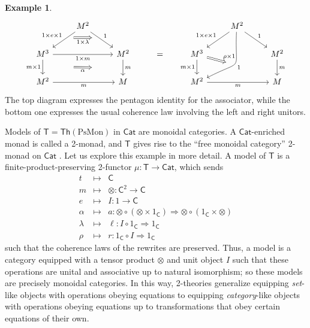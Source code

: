 \documentclass{amsart}
\theoremstyle{definition}
\newtheorem{example}[theorem]{Example}
\newcommand{\Th}{\mathsf{Th}}
\newcommand{\Cat}{\mathsf{Cat}}
\newcommand{\C}{\mathsf{C}}
\newcommand{\T}{\mathsf{T}}
\newcommand{\maps}{\colon}
\begin{document}
\begin{example}
      \[\begin{tikzcd}
          & M^2 \ar[dl,"1\times e\times 1",""name=a1,swap] \ar[dr,"1",""name=a2] \arrow[Rightarrow,from=a1,to=a2,"1\times \lambda",swap,shorten >=0.4cm,shorten <=0.4cm] & && & M^2 \ar[dl,"1\times e\times 1",swap] \ar[dr,"1"] \ar[ddl,bend left =30,looseness=2, "1",""name=c1] & \\
          M^3 \ar[d,"m\times 1",swap,""name=b1] \ar[rr,"1\times m",swap] && M^2 \ar[d,"m",""name=b2] \arrow[Rightarrow,from=b1,to=b2,"\alpha",shorten >=1.3cm,shorten <=1.3cm,swap] & = & M^3 \ar[d,"m\times 1",swap] \arrow[Rightarrow,to=c1,"\rho\times 1",shorten >=0.4cm,shorten <=0.0cm] && M^2 \ar[d,"m"] \\
          M^2 \ar[rr,"m",swap] && M && M^2 \ar[rr,"m",swap] && M
        \end{tikzcd}\]
\noindent The top diagram expresses the pentagon identity for the associator, while the bottom one expresses the usual coherence law involving the left and right unitors.
   
Models of $\T = \Th(\mathrm{PsMon})$ in $\Cat$ are monoidal categories.   A $\Cat$-enriched monad is called a 2-monad, and $\T$ gives rise to the ``free monoidal category'' 2-monad on $\Cat$ \cite{bkp}.
Let us explore this example in more detail.  A model of $\T$ is a finite-product-preserving 2-functor $\mu\colon \T\to \Cat$, which sends 
\[\begin{array}{rcc}
	t & \mapsto& \C \\
	m & \mapsto & \otimes\maps  \C^2 \to \C \\
	e & \mapsto & I\maps  1\to \C \\
	\alpha & \mapsto & a \maps  \otimes \circ (\otimes \times 1_\C)  \Rightarrow  \otimes \circ (1_\C \times \otimes)\\
	\lambda & \mapsto & \ell \maps  I\circ 1_\C  \Rightarrow  1_\C\\
	\rho & \mapsto & r \maps  1_\C \circ I  \Rightarrow  1_\C
\end{array}\]
such that the coherence laws of the rewrites are preserved.  Thus, a model is a category equipped with a tensor product $\otimes$ and unit object $I$ such that these operations are unital and associative up to natural isomorphism; so these models are precisely monoidal categories. In this way, 2-theories generalize equipping \textit{set}-like objects  with operations obeying equations to equipping \textit{category}-like objects with operations obeying equations up to 
transformations that obey certain equations of their own.


\end{example}
\end{document}
